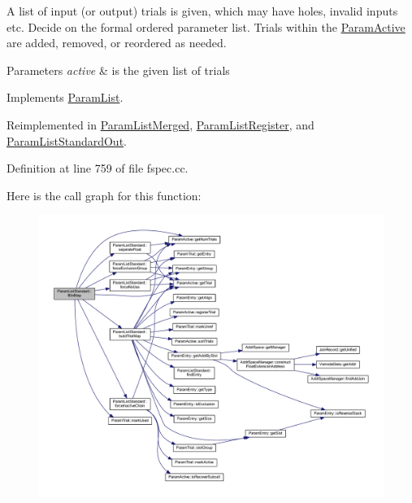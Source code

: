 A list of input (or output) trials is given, which may have holes, invalid inputs etc. Decide on the formal ordered parameter list. Trials within the \mbox{\hyperlink{class_param_active}{Param\+Active}} are added, removed, or reordered as needed. 
\begin{DoxyParams}{Parameters}
{\em active} & is the given list of trials \\
\hline
\end{DoxyParams}


Implements \mbox{\hyperlink{class_param_list_aaf2680343e933767d7ffd38e22e84011}{Param\+List}}.



Reimplemented in \mbox{\hyperlink{class_param_list_merged_aa4252b6768505e059edfe83ebdbf2065}{Param\+List\+Merged}}, \mbox{\hyperlink{class_param_list_register_a35bf1a7b1033500cb3657608c27d4786}{Param\+List\+Register}}, and \mbox{\hyperlink{class_param_list_standard_out_aab2d6055785c4e98b3a8c4e1b70f86be}{Param\+List\+Standard\+Out}}.



Definition at line 759 of file fspec.\+cc.

Here is the call graph for this function\+:
\nopagebreak
\begin{figure}[H]
\begin{center}
\leavevmode
\includegraphics[width=350pt]{class_param_list_standard_a7fa7043f5c6bba995e2ea716ca16ccaf_cgraph}
\end{center}
\end{figure}
\mbox{\label{class_param_list_standard_a8cc59fbeecbf61a1acc32ce2f333788e}} 
